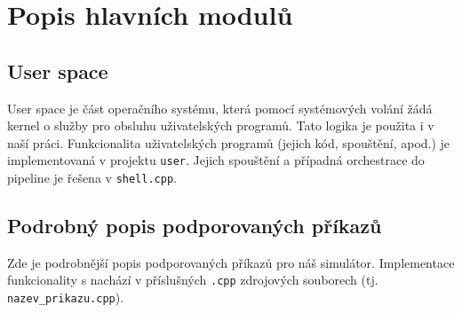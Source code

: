 \documentclass[12pt, a4paper]{article}
\let\oldsection\section
\renewcommand\section{\clearpage\oldsection}
\begin{document}
		
	
    
   
    
    
    
    
    
    

    \section{Popis hlavních modulů}

%
%
%
%
%
%

	\subsection{User space}
	User space je část operačního systému, která pomocí systémových volání žádá kernel o služby pro obsluhu uživatelských programů. Tato logika je použita i v naší práci. Funkcionalita uživatelských programů (jejich kód, spouštění, apod.) je implementovaná v projektu \texttt{user}. Jejich spouštění a případná orchestrace do pipeline je řešena v \texttt{shell.cpp}.
	
	
	\subsection{Podrobný popis podporovaných příkazů} \label{subDetail}
	Zde je podrobnější popis podporovaných příkazů pro náš simulátor. Implementace funkcionality s nachází v příslušných \texttt{.cpp} zdrojových souborech (tj. \texttt{nazev_prikazu.cpp}).    
    
\end{document}

